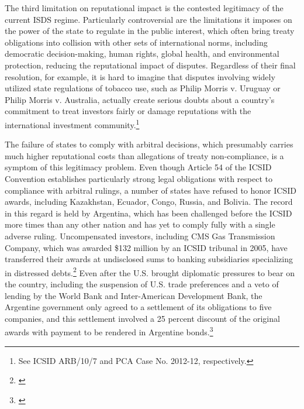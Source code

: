 \documentclass[12pt,onesided]{amsart}
\begin{document}
The third limitation on reputational impact is the contested legitimacy of the current ISDS regime. Particularly controversial are the limitations it imposes on the power of the state to regulate in the public interest, which often bring treaty obligations into collision with other sets of international norms, including democratic decision-making, human rights, global health, and environmental protection, reducing the reputational impact of disputes. Regardless of their final resolution, for example, it is hard to imagine that disputes involving widely utilized state regulations of tobacco use, such as Philip Morris v. Uruguay or Philip Morris v. Australia, actually create serious doubts about a country's commitment to treat investors fairly or damage reputations with the international investment community.\footnote{See ICSID ARB/10/7 and PCA Case No. 2012-12, respectively.} 

The failure of states to comply with arbitral decisions, which presumably carries much higher reputational costs than allegations of treaty non-compliance, is a symptom of this legitimacy problem. Even though Article 54 of the ICSID Convention establishes particularly strong legal obligations with respect to compliance with arbitral rulings, a number of states have refused to honor ICSID awards, including Kazakhstan, Ecuador, Congo, Russia, and Bolivia. The record in this regard is held by Argentina, which has been challenged before the ICSID more times than any other nation and has yet to comply fully with a single adverse ruling. Uncompensated investors, including CMS Gas Transmission Company, which was awarded \$132 million by an ICSID tribunal in 2005, have transferred their awards at undisclosed sums to banking subsidiaries specializing in distressed debts.\footnote{\citet{peterson:2009}} Even after the U.S. brought diplomatic pressures to bear on the country, including the suspension of U.S. trade preferences and a veto of lending by the World Bank and Inter-American Development Bank, the Argentine government only agreed to a settlement of its obligations to five companies, and this settlement involved a 25 percent discount of the original awards with payment to be rendered in Argentine bonds.\footnote{\citet{nacion:2013}} 
\end{document}
